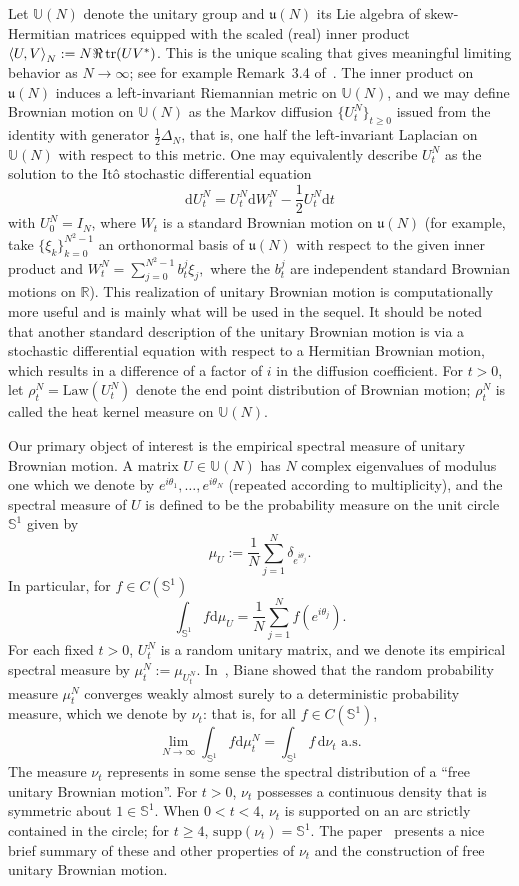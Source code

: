 \documentclass[11pt]{article}
\theoremstyle{definition}
\numberwithin{equation}{section}
\numberwithin{figure}{section}
\numberwithin{table}{section}
\DeclareMathOperator{\tr}{tr}
\newcommand{\Unitary}[1]{\mathbb{U}\left(#1\right)}
\newcommand{\R}{\mathbb{R}}
\newcommand{\inprod}[2]{\left\langle #1, #2 \right\rangle}
\newcommand*{\dd}{\mathrm{d}}
\newcommand*{\dmu}{\dd \mu}
\newcommand*{\dt}{\dd t}
\newcommand*{\mK}{\mkern 1mu}
\begin{document}
Let $\Unitary{N}$ denote the unitary group and $\mathfrak{u}(N)$ its Lie algebra of skew-Hermitian matrices equipped with the scaled (real) inner product $\inprod{U}{V}_N:=N\mK \Re\tr(UV^*)$. This is the unique scaling that gives meaningful limiting behavior as $N\rightarrow\infty$; see for example Remark~3.4 of~\cite{DHK2013}. The inner product on $\mathfrak{u}(N)$ induces a left-invariant Riemannian metric on $\mathbb{U}(N)$, and we may define Brownian motion on $\Unitary{N}$ as the Markov diffusion $\{U^N_t\}_{t\ge0}$ issued from the identity with generator $\frac{1}{2}\Delta_{N}$, that is, one half the left-invariant Laplacian on $\mathbb{U}(N)$ with respect to this metric. One may equivalently describe $U^N_t$ as the solution to the It\^o stochastic differential equation
\begin{equation*}
\dd U^N_t=U^{N}_t\dd W^N_t-\frac{1}{2}U^{N}_t\dt
\end{equation*}
with $U^N_0=I_N$, where $W_t$ is a standard Brownian motion on $\mathfrak{u}(N)$ (for example, take $\{\xi_k\}_{k=0}^{N^2-1}$ an orthonormal basis of $\mathfrak{u}(N)$ with respect to the given inner product and $W^N_t=\sum_{j=0}^{N^2-1}b^j_t\xi_j,$ where the $b^j_t$ are independent standard Brownian motions on $\R$). This realization of unitary Brownian motion is computationally more useful and is mainly what will be used in the sequel. It should be noted that another standard description of the unitary Brownian motion is via a stochastic differential equation with respect to a Hermitian Brownian motion, which results in a difference of a factor of $i$ in the diffusion coefficient. For $t>0$, let $\rho^N_t=\mathrm{Law}(U^N_t)$ denote the end point distribution of Brownian motion; $\rho^N_t$ is called the heat kernel measure on $\mathbb{U}(N)$.

Our primary object of interest is the empirical spectral measure of unitary Brownian motion. A matrix $U\in\mathbb{U}(N)$ has $N$ complex eigenvalues of modulus one which we denote by $e^{i\theta_1},\ldots,e^{i\theta_N}$ (repeated according to multiplicity), and the spectral measure of $U$ is defined to be the probability measure on the unit circle $\mathbb{S}^1$ given by
\[
\mu_U:=\frac{1}{N}\sum_{j=1}^N \delta_{e^{i\theta_j}}.
\]
In particular, for $f\in C(\mathbb{S}^1)$
\[
\int_{\mathbb{S}^1} f \dmu_U = \frac{1}{N}\sum_{j=1}^N f(e^{i\theta_j}).
\]
For each fixed $t>0$, $U^N_t$ is a random unitary matrix, and we denote its empirical spectral measure by $\mu^N_t:=\mu_{U^N_t}$. In~\cite{Biane1997}, Biane showed that the random probability measure $\mu^N_t$ converges weakly almost surely to a deterministic probability measure, which we denote by $\nu_t$: that is, for all $f\in C(\mathbb{S}^1)$,
\[
\lim_{N\rightarrow\infty} \int_{\mathbb{S}^1} f \dmu^N_t = \int_{\mathbb{S}^1} f\,\dd\nu_t \text{ a.s.}
\]
The measure $\nu_t$ represents in some sense the spectral distribution of a ``free unitary Brownian motion''. For $t>0$, $\nu_t$ possesses a continuous density that is symmetric about $1\in\mathbb{S}^1$. When $0<t<4$, $\nu_t$ is supported on an arc strictly contained in the circle; for $t\ge4$, $\mathrm{supp}(\nu_t)=\mathbb{S}^1$. The paper~\cite{CDK2016} presents a nice brief summary of these and other properties of $\nu_t$ and the construction of free unitary Brownian motion.
\end{document}
